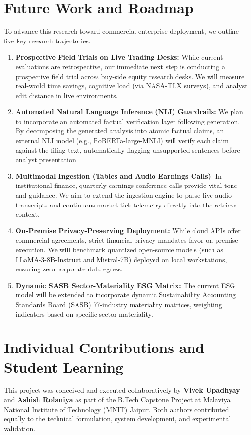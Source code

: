 \documentclass[conference]{IEEEtran}
\begin{document}
\section{Future Work and Roadmap}
To advance this research toward commercial enterprise deployment, we outline five key research trajectories:
\begin{enumerate}
    \item \textbf{Prospective Field Trials on Live Trading Desks:} While current evaluations are retrospective, our immediate next step is conducting a prospective field trial across buy-side equity research desks. We will measure real-world time savings, cognitive load (via NASA-TLX surveys), and analyst edit distance in live environments.
    \item \textbf{Automated Natural Language Inference (NLI) Guardrails:} We plan to incorporate an automated factual verification layer following generation. By decomposing the generated analysis into atomic factual claims, an external NLI model (e.g., RoBERTa-large-MNLI) will verify each claim against the filing text, automatically flagging unsupported sentences before analyst presentation.
    \item \textbf{Multimodal Ingestion (Tables and Audio Earnings Calls):} In institutional finance, quarterly earnings conference calls provide vital tone and guidance. We aim to extend the ingestion engine to parse live audio transcripts and continuous market tick telemetry directly into the retrieval context.
    \item \textbf{On-Premise Privacy-Preserving Deployment:} While cloud APIs offer commercial agreements, strict financial privacy mandates favor on-premise execution. We will benchmark quantized open-source models (such as LLaMA-3-8B-Instruct and Mistral-7B) deployed on local workstations, ensuring zero corporate data egress.
    \item \textbf{Dynamic SASB Sector-Materiality ESG Matrix:} The current ESG model will be extended to incorporate dynamic Sustainability Accounting Standards Board (SASB) 77-industry materiality matrices, weighting indicators based on specific sector materiality.
\end{enumerate}

\section{Individual Contributions and Student Learning}
This project was conceived and executed collaboratively by \textbf{Vivek Upadhyay} and \textbf{Ashish Rolaniya} as part of the B.Tech Capstone Project at Malaviya National Institute of Technology (MNIT) Jaipur. Both authors contributed equally to the technical formulation, system development, and experimental validation.
\end{document}
